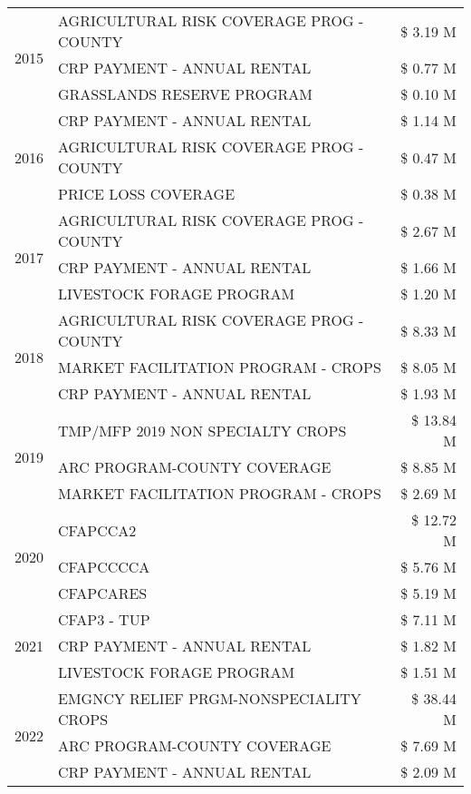 \begin{tabular}{llr}
\cline{1-3}
\multirow[t]{3}{*}{2015} & AGRICULTURAL RISK COVERAGE PROG - COUNTY & \$ 3.19 M \\
 & CRP PAYMENT - ANNUAL RENTAL & \$ 0.77 M \\
 & GRASSLANDS RESERVE PROGRAM & \$ 0.10 M \\
\cline{1-3}
\multirow[t]{3}{*}{2016} & CRP PAYMENT - ANNUAL RENTAL & \$ 1.14 M \\
 & AGRICULTURAL RISK COVERAGE PROG - COUNTY & \$ 0.47 M \\
 & PRICE LOSS COVERAGE & \$ 0.38 M \\
\cline{1-3}
\multirow[t]{3}{*}{2017} & AGRICULTURAL RISK COVERAGE PROG - COUNTY & \$ 2.67 M \\
 & CRP PAYMENT - ANNUAL RENTAL & \$ 1.66 M \\
 & LIVESTOCK FORAGE PROGRAM & \$ 1.20 M \\
\cline{1-3}
\multirow[t]{3}{*}{2018} & AGRICULTURAL RISK COVERAGE PROG - COUNTY & \$ 8.33 M \\
 & MARKET FACILITATION PROGRAM - CROPS & \$ 8.05 M \\
 & CRP PAYMENT - ANNUAL RENTAL & \$ 1.93 M \\
\cline{1-3}
\multirow[t]{3}{*}{2019} & TMP/MFP 2019 NON SPECIALTY CROPS & \$ 13.84 M \\
 & ARC PROGRAM-COUNTY COVERAGE & \$ 8.85 M \\
 & MARKET FACILITATION PROGRAM - CROPS & \$ 2.69 M \\
\cline{1-3}
\multirow[t]{3}{*}{2020} & CFAPCCA2 & \$ 12.72 M \\
 & CFAPCCCCA & \$ 5.76 M \\
 & CFAPCARES & \$ 5.19 M \\
\cline{1-3}
\multirow[t]{3}{*}{2021} & CFAP3 - TUP & \$ 7.11 M \\
 & CRP PAYMENT - ANNUAL RENTAL & \$ 1.82 M \\
 & LIVESTOCK FORAGE PROGRAM & \$ 1.51 M \\
\cline{1-3}
\multirow[t]{3}{*}{2022} & EMGNCY RELIEF PRGM-NONSPECIALITY CROPS & \$ 38.44 M \\
 & ARC PROGRAM-COUNTY COVERAGE & \$ 7.69 M \\
 & CRP PAYMENT - ANNUAL RENTAL & \$ 2.09 M \\
\cline{1-3}
\bottomrule
\end{tabular}
